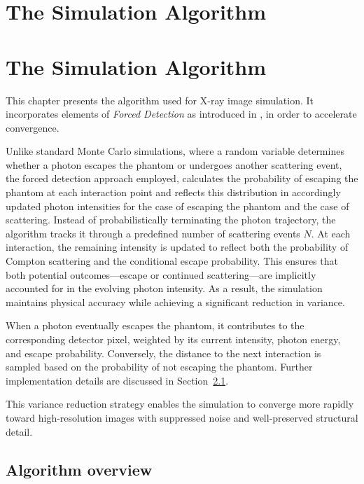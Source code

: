 \chapter{The Simulation Algorithm} %
\label{Chapter5}

\chapter{The Simulation Algorithm}
\label{Chapter5}

This chapter presents the algorithm used for X-ray image simulation. It
incorporates elements of \emph{Forced Detection} as introduced in \cite{fd2001},
in order to accelerate convergence.

Unlike standard Monte Carlo simulations, where a random variable determines
whether a photon escapes the phantom or undergoes another scattering event, the
forced detection approach employed, calculates the probability of escaping the
phantom at each interaction point and reflects this distribution in accordingly
updated photon intensities for the case of escaping the phantom and the case of
scattering. Instead of probabilistically terminating the photon trajectory, the
algorithm tracks it through a predefined number of scattering events $N$. At
each interaction, the remaining intensity is updated to reflect both the
probability of Compton scattering and the conditional escape probability. This
ensures that both potential outcomes—escape or continued scattering—are
implicitly accounted for in the evolving photon intensity. As a result, the
simulation maintains physical accuracy while achieving a significant reduction
in variance.

When a photon eventually escapes the phantom, it contributes to the
corresponding detector pixel, weighted by its current intensity, photon energy,
and escape probability. Conversely, the distance to the next interaction is
sampled based on the probability of not escaping the phantom. Further
implementation details are discussed in Section~\ref{sec:algorithmOverview}.

This variance reduction strategy enables the simulation to converge more rapidly
toward high-resolution images with suppressed noise and well-preserved
structural detail.


\section{Algorithm overview}
\label{sec:algorithmOverview}

